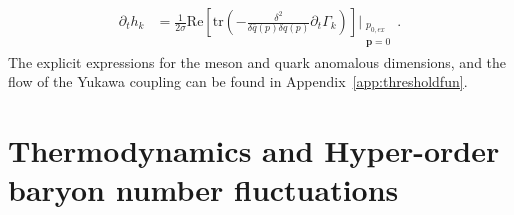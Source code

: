 \documentclass[%
reprint,
superscriptaddress,
showpacs,preprintnumbers,
 amsmath,amssymb,
 aps,
prd,
]{revtex4-1}
\def\app#1{Appendix~\ref{#1}}
\begin{document}
\begin{align}
  \partial_t h_k&=\frac{1}{2 \sigma}\mathrm{Re}\left[\mathrm{tr}\left(-\frac{\delta^2}{\delta\bar{q}(p)
            \delta q(p)}\partial_t \Gamma_k\right)\right]\Bigg|_{\substack{p_{0,ex}\\ \bm{p}=0}}\,.  \label{eq:dth}
\end{align}
The explicit expressions for the meson and quark anomalous dimensions, and the flow of the Yukawa coupling can be found in \app{app:thresholdfun}.


\section{Thermodynamics and Hyper-order baryon number fluctuations}
\label{sec:hyper-fluc}
\end{document}
